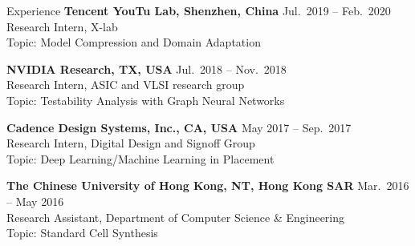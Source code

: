 
\begin{rSection}{Experience}
{\bf Tencent YouTu Lab, Shenzhen, China}         \hfill { Jul.~2019 -- Feb.~2020} \\
Research Intern, X-lab\\
Topic: Model Compression and Domain Adaptation
    
{\bf NVIDIA Research, TX, USA}               \hfill { Jul.~2018 -- Nov.~2018} \\
Research Intern, ASIC and VLSI research group\\
Topic: Testability Analysis with Graph Neural Networks

{\bf Cadence Design Systems, Inc., CA, USA}               \hfill { May 2017 -- Sep.~2017} \\
Research Intern, Digital Design and Signoff Group\\
Topic: Deep Learning/Machine Learning in Placement

{\bf The Chinese University of Hong Kong, NT, Hong Kong SAR}  \hfill { Mar.~2016 -- May 2016} \\ 
Research Assistant, Department of Computer Science \& Engineering \\
Topic: Standard Cell Synthesis

\end{rSection}


